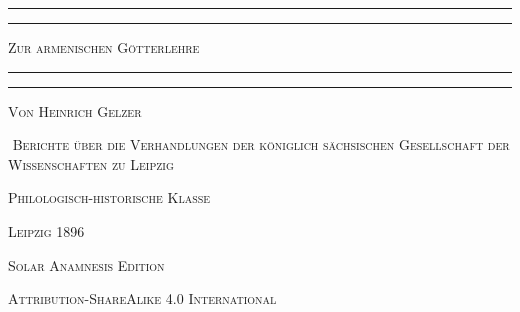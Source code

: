 \documentclass{article}
\begin{document}
\begin{titlepage} %
	\centering %


	\rule{\textwidth}{1.6pt}\vspace*{-\baselineskip}\vspace*{2pt} %
	\rule{\textwidth}{0.4pt} %
	
	\vspace{1\baselineskip} %
	
	{\scshape\Huge Zur armenischen Götterlehre}
	
	\vspace{1\baselineskip} %

	\rule{\textwidth}{0.4pt}\vspace*{-\baselineskip}\vspace{3.2pt} %
	\rule{\textwidth}{1.6pt} %
	
	\vspace{1\baselineskip} %
	
	
        {\scshape Von \large Heinrich Gelzer}
 
        \vspace{1.0\baselineskip}

‌        {\scshape\small Berichte über die Verhandlungen der königlich sächsischen Gesellschaft der Wissenschaften zu Leipzig}

        \vspace*{\fill}    

        \vspace{1.0\baselineskip}

        {\scshape Philologisch-historische Klasse}
        
	\vspace{1\baselineskip}

        {\scshape\small Leipzig 1896}
		
	\vspace{0.25\baselineskip} %

        {\scshape\small Solar Anamnesis Edition}%
    
	{\scshape\footnotesize Attribution-ShareAlike 4.0 International } %
\end{titlepage}
\clearpage
\tableofcontents
\clearpage
\end{document}
